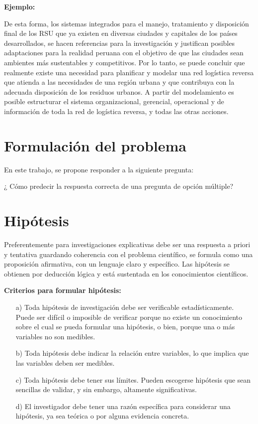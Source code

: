 {\bf Ejemplo:}\par

De esta forma, los sistemas integrados para el manejo, tratamiento y disposición final de los RSU que ya existen en diversas ciudades y capitales de los países desarrollados, se hacen referencias para la investigación y justifican posibles adaptaciones para la realidad peruana con el objetivo de que las ciudades sean ambientes más sustentables y competitivos.
\vskip 0.3cm
 Por lo tanto, se puede concluir que realmente existe una necesidad para planificar y modelar una red logística reversa que atienda a las necesidades de una región urbana y que contribuya con la adecuada disposición de los residuos urbanos. A partir del modelamiento es posible estructurar el sistema organizacional, gerencial, operacional y de información de toda la red  de logística reversa, y todas las otras acciones.


\section{Formulación del problema}

  En este trabajo, se propone responder a la siguiente pregunta:
 \begin{center} 
     ¿ Cómo predecir la respuesta correcta de una pregunta de opción múltiple?
 \end{center}


\section{Hipótesis}
Preferentemente para investigaciones explicativas debe ser una respuesta a priori y tentativa guardando coherencia con el problema científico, se formula como una proposición afirmativa, con un lenguaje claro y específico.  Las hipótesis se obtienen por deducción lógica y está sustentada en los conocimientos científicos. \par  
\vskip 0.3cm
{\bf Criterios para formular hipótesis:} \cite{Erica}
\begin{enumerate}
\item[a)] Toda hipótesis de investigación debe ser verificable estadísticamente.  Puede ser difícil o imposible de verificar porque no existe un conocimiento sobre el cual se pueda formular una hipótesis, o bien, porque una o más variables no son medibles.
\vskip 0.2cm
\item[b)] Toda hipótesis debe indicar la relación entre variables, lo que implica que las variables deben ser medibles.
\vskip 0.2cm
\item[c)] Toda hipótesis debe tener sus límites. Pueden escogerse hipótesis que sean sencillas de validar, y sin embargo, altamente significativas.
\vskip 0.2cm
\item[d)] El investigador debe tener una razón específica para considerar una hipótesis, ya sea teórica o por alguna evidencia concreta.    
\end{enumerate}





